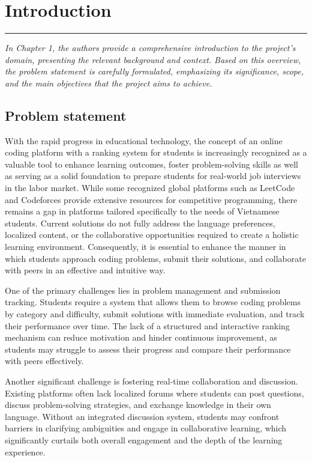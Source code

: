 \chapter{Introduction}
\noindent
\rule{\textwidth}{0.4pt}

\begin{center}
\begin{minipage}{0.8\textwidth}
\textit{In Chapter 1, the authors provide a comprehensive introduction to the project’s domain, presenting the relevant background and context. Based on this overview, the problem statement is carefully formulated, emphasizing its significance, scope, and the main objectives that the project aims to achieve.}
\end{minipage}
\end{center}

\section{Problem statement}

With the rapid progress in educational technology, the concept of an online coding platform with a ranking system for students is increasingly recognized as a valuable tool to enhance learning outcomes, foster problem-solving skills as well as serving as a solid foundation to prepare students for real-world job interviews in the labor market. While some recognized global platforms such as LeetCode and Codeforces provide extensive resources for competitive programming, there remains a gap in platforms tailored specifically to the needs of Vietnamese students. Current solutions do not fully address the language preferences, localized content, or the collaborative opportunities required to create a holistic learning environment. Consequently, it is essential to enhance the manner in which students approach coding problems, submit their solutions, and collaborate with peers in an effective and intuitive way.

One of the primary challenges lies in problem management and submission tracking. Students require a system that allows them to browse coding problems by category and difficulty, submit solutions with immediate evaluation, and track their performance over time. The lack of a structured and interactive ranking mechanism can reduce motivation and hinder continuous improvement, as students may struggle to assess their progress and compare their performance with peers effectively.

Another significant challenge is fostering real-time collaboration and discussion. Existing platforms often lack localized forums where students can post questions, discuss problem-solving strategies, and exchange knowledge in their own language. Without an integrated discussion system, students may confront barriers in clarifying ambiguities and engage in collaborative learning, which significantly curtails both overall engagement and the depth of the learning experience.

